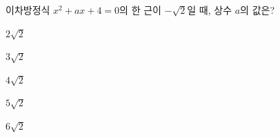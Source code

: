 이차방정식 $x^2+ax+4=0$의 한 근이 $-\sqrt{2}$일 때, 상수 $a$의 값은?
\begin{choices32}{\rule[-3ex]{0pt}{8ex}$2\sqrt{2}$}{\rule[-3ex]{0pt}{8ex}$3\sqrt{2}$}{\rule[-3ex]{0pt}{8ex}$4\sqrt{2}$}{\rule[-3ex]{0pt}{8ex}$5\sqrt{2}$}{\rule[-3ex]{0pt}{8ex}$6\sqrt{2}$}\end{choices32}
